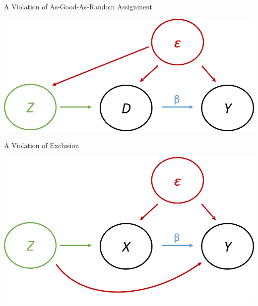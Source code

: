 \documentclass{beamer}
\begin{document}
\begin{frame}{A Violation of As-Good-As-Random Assignment}
\begin{center}
\includegraphics[scale=0.6]{./lecture_includes/dag4.png}
\end{center}
\end{frame}

\begin{frame}{A Violation of Exclusion}
\begin{center}
\includegraphics[scale=0.6]{./lecture_includes/dag5.png}
\end{center}
\end{frame}
\end{document}
